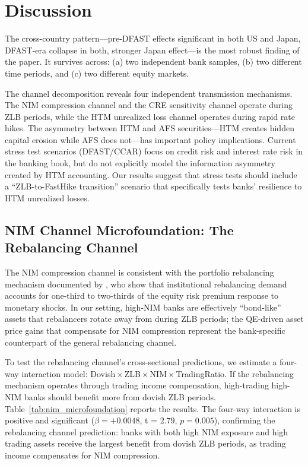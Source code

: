 \documentclass[12pt,a4paper]{article}
\begin{document}
\section{Discussion}\label{sec:discussion}

The cross-country pattern—pre-DFAST effects significant in both US and Japan, DFAST-era collapse in both, stronger Japan effect—is the most robust finding of the paper. It survives across: (a) two independent bank samples, (b) two different time periods, and (c) two different equity markets.

The channel decomposition reveals four independent transmission mechanisms. The NIM compression channel and the CRE sensitivity channel operate during ZLB periods, while the HTM unrealized loss channel operates during rapid rate hikes. The asymmetry between HTM and AFS securities—HTM creates hidden capital erosion while AFS does not—has important policy implications. Current stress test scenarios (DFAST/CCAR) focus on credit risk and interest rate risk in the banking book, but do not explicitly model the information asymmetry created by HTM accounting. Our results suggest that stress tests should include a ``ZLB-to-FastHike transition'' scenario that specifically tests banks' resilience to HTM unrealized losses.

\subsection{NIM Channel Microfoundation: The Rebalancing Channel}

The NIM compression channel is consistent with the portfolio rebalancing mechanism documented by \citet{LuWu2024}, who show that institutional rebalancing demand accounts for one-third to two-thirds of the equity risk premium response to monetary shocks. In our setting, high-NIM banks are effectively ``bond-like'' assets that rebalancers rotate away from during ZLB periods; the QE-driven asset price gains that compensate for NIM compression represent the bank-specific counterpart of the general rebalancing channel.

To test the rebalancing channel's cross-sectional predictions, we estimate a four-way interaction model: Dovish\,$\times$\,ZLB\,$\times$\,NIM\,$\times$\,TradingRatio. If the rebalancing mechanism operates through trading income compensation, high-trading high-NIM banks should benefit more from dovish ZLB periods. Table~\ref{tab:nim_microfoundation} reports the results. The four-way interaction is positive and significant ($\beta = +0.0048$, t = $2.79$, $p = 0.005$), confirming the rebalancing channel prediction: banks with both high NIM exposure and high trading assets receive the largest benefit from dovish ZLB periods, as trading income compensates for NIM compression.
\end{document}
